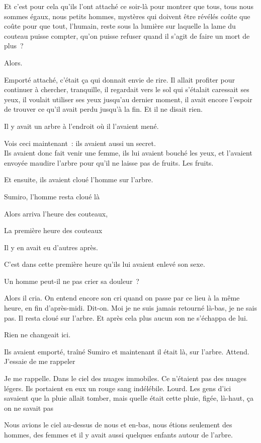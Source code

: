 Et c'est pour cela qu'ils l'ont attaché ce soir-là pour montrer que
tous, tous nous sommes égaux, nous petits hommes, mystères qui doivent
être révélés coûte que coûte pour que tout, l'humain, reste sous la
lumière sur laquelle la lame du couteau puisse compter, qu'on puisse
refuser quand il s'agit de faire un mort de plus~?

Alors.

Emporté attaché, c'était ça qui donnait envie de rire. Il allait
profiter pour continuer à chercher, tranquille, il regardait vers le sol
qui s'étalait caressait ses yeux, il voulait utiliser ses yeux jusqu'au
dernier moment, il avait encore l'espoir de trouver ce qu'il avait perdu
jusqu'à la fin. Et il ne disait rien.

Il y avait un arbre à l'endroit où il l'avaient mené.

Vois ceci maintenant~: ils avaient aussi un secret.\\

Ils avaient donc fait venir une femme, ils lui avaient bouché les yeux,
et l'avaient envoyée maudire l'arbre pour qu'il ne laisse pas de fruits.
Les fruits.

Et ensuite, ils avaient cloué l'homme sur l'arbre.

Sumiro, l'homme resta cloué là

Alors arriva l'heure des couteaux,

La première heure des couteaux

Il y en avait eu d'autres après.

C'est dans cette première heure qu'ils lui avaient enlevé son sexe.

Un homme peut-il ne pas crier sa douleur~?

Alors il cria. On entend encore son cri quand on passe par ce lieu à la
même heure, en fin d'après-midi. Dit-on. Moi je ne suis jamais retourné
là-bas, je ne sais pas. Il resta cloué sur l'arbre. Et après cela plus
aucun son ne s'échappa de lui.

Rien ne changeait ici.

Ils avaient emporté, traîné Sumiro et maintenant il était là, sur
l'arbre. Attend. J'essaie de me rappeler

Je me rappelle. Dans le ciel des nuages immobiles. Ce n'étaient pas des
nuages légers. Ils portaient en eux un rouge sang indélébile. Lourd. Les
gens d'ici savaient que la pluie allait tomber, mais quelle était cette
pluie, figée, là-haut, ça on ne savait pas

Nous avions le ciel au-dessus de nous et en-bas, nous étions seulement
des hommes, des femmes et il y avait aussi quelques enfants autour de
l'arbre.


